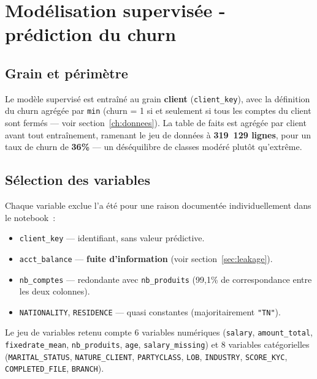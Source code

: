 \documentclass[11pt,a4paper]{report}
\begin{document}
\chapter{Mod\'elisation supervis\'ee - pr\'ediction du churn}
\label{ch:ml}

\section{Grain et p\'erim\`etre}

Le mod\`ele supervis\'e est entra\^in\'e au grain \textbf{client}
(\texttt{client\_key}), avec la d\'efinition du churn agr\'eg\'ee par
\texttt{min} (churn = 1 si et seulement si tous les comptes du client sont
ferm\'es --- voir section~\ref{ch:donnees}). La table de faits est agr\'eg\'ee par
client avant tout entra\^inement, ramenant le jeu de donn\'ees \`a
\textbf{319~129 lignes}, pour un taux de churn de \textbf{36\%} --- un
d\'es\'equilibre de classes mod\'er\'e plut\^ot qu'extr\^eme.

\section{S\'election des variables}

Chaque variable exclue l'a \'et\'e pour une raison document\'ee individuellement
dans le notebook~:

\begin{itemize}
\item \texttt{client\_key} --- identifiant, sans valeur pr\'edictive.
\item \texttt{acct\_balance} --- \textbf{fuite d'information} (voir
      section~\ref{sec:leakage}).
\item \texttt{nb\_comptes} --- redondante avec \texttt{nb\_produits}
      (99,1\% de correspondance entre les deux colonnes).
\item \texttt{NATIONALITY}, \texttt{RESIDENCE} --- quasi constantes
      (majoritairement \texttt{"TN"}).
\end{itemize}

Le jeu de variables retenu compte 6 variables num\'eriques
(\texttt{salary}, \texttt{amount\_total}, \texttt{fixedrate\_mean},
\texttt{nb\_produits}, \texttt{age}, \texttt{salary\_missing}) et 8 variables
cat\'egorielles (\texttt{MARITAL\_STATUS}, \texttt{NATURE\_CLIENT},
\texttt{PARTYCLASS}, \texttt{LOB}, \texttt{INDUSTRY}, \texttt{SCORE\_KYC},
\texttt{COMPLETED\_FILE}, \texttt{BRANCH}).
\end{document}
